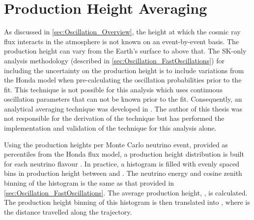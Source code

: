 \clearpage

\section{Production Height Averaging}
\label{sec:Oscillation_ProdHAvergaing}

As discussed in \autoref{sec:Oscillation_Overview}, the height at which the cosmic ray flux interacts in the atmosphere is not known on an event-by-event basis. The production height can vary from the Earth's surface to  above that. The SK-only analysis methodology (described in \autoref{sec:Oscillation_FastOscillations}) for including the uncertainty on the production height is to include variations from the Honda model when pre-calculating the oscillation probabilities prior to the fit. This technique is not possible for this analysis which uses continuous oscillation parameters that can not be known prior to the fit. Consequently, an analytical averaging technique was developed in \cite{t2k_tn_425}. The author of this thesis was not responsible for the derivation of the technique but has performed the implementation and validation of the technique for this analysis alone.

Using the  production heights per Monte Carlo neutrino event, provided as  percentiles from the Honda flux model, a production height distribution  is built for each neutrino flavour . In practice, a histogram is filled with  evenly spaced bins in production height  between  and . The neutrino energy and cosine zenith binning of the histogram is the same as that provided in \autoref{sec:Oscillation_FastOscillations}. The average production height, , is calculated. The production height binning of this histogram is then translated into , where  is the distance travelled along the trajectory.

